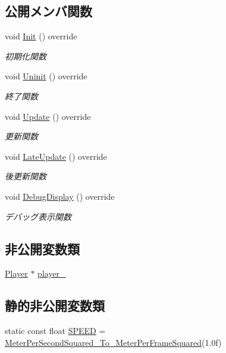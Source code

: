 \subsection*{公開メンバ関数}
\begin{DoxyCompactItemize}
\item 
void \mbox{\hyperlink{class_player_update___special_a48906da6915325d92d5cc6ec67212259}{Init}} () override
\begin{DoxyCompactList}\small\item\em 初期化関数 \end{DoxyCompactList}\item 
void \mbox{\hyperlink{class_player_update___special_a60b5982ed56b52293a9e651ae7bf305f}{Uninit}} () override
\begin{DoxyCompactList}\small\item\em 終了関数 \end{DoxyCompactList}\item 
void \mbox{\hyperlink{class_player_update___special_afef3503e292dbaded809068fd87deadd}{Update}} () override
\begin{DoxyCompactList}\small\item\em 更新関数 \end{DoxyCompactList}\item 
void \mbox{\hyperlink{class_player_update___special_a1daae8fdcd87bf907313a98e022f254c}{Late\+Update}} () override
\begin{DoxyCompactList}\small\item\em 後更新関数 \end{DoxyCompactList}\item 
void \mbox{\hyperlink{class_player_update___special_a6253000b53b2c5bc73ce0ed4d3b4a82a}{Debug\+Display}} () override
\begin{DoxyCompactList}\small\item\em デバッグ表示関数 \end{DoxyCompactList}\end{DoxyCompactItemize}
\subsection*{非公開変数類}
\begin{DoxyCompactItemize}
\item 
\mbox{\hyperlink{class_player}{Player}} $\ast$ \mbox{\hyperlink{class_player_update___special_adbf3a64a60324cc274e2084bbeef04c9}{player\+\_\+}}
\end{DoxyCompactItemize}
\subsection*{静的非公開変数類}
\begin{DoxyCompactItemize}
\item 
static const float \mbox{\hyperlink{class_player_update___special_a483e5e5a21d22c31c90194eb4e05e26f}{S\+P\+E\+ED}} = \mbox{\hyperlink{_meter_to_frame_8h_a3a2c155748ceb2eab2a3c303ae48ecc0}{Meter\+Per\+Second\+Squared\+\_\+\+To\+\_\+\+Meter\+Per\+Frame\+Squared}}(1.\+0f)
\end{DoxyCompactItemize}



